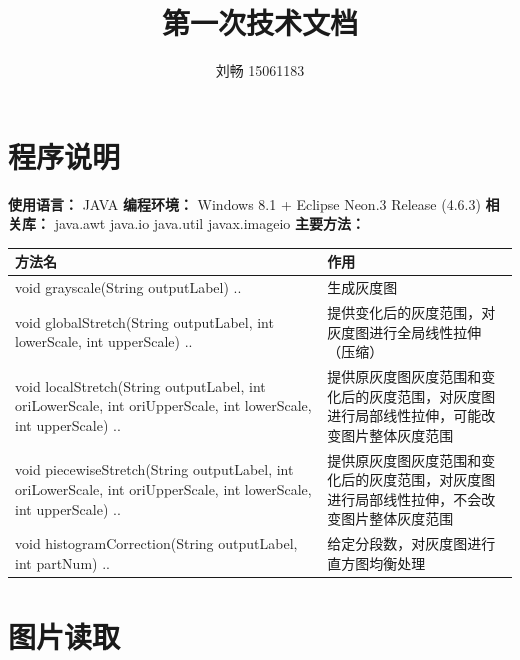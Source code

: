 \documentclass[UTF8]{ctexart}
\title{第一次技术文档}
\author{刘畅 15061183}
\begin{document}
	\maketitle
	\section{程序说明}
	\noindent
	\textbf{使用语言：} JAVA \newline
	\textbf{编程环境：} Windows 8.1 + Eclipse Neon.3 Release (4.6.3) \newline
	\textbf{相关库：}\newline
	\indent java.awt\newline
	\indent java.io\newline
	\indent java.util\newline
	\indent javax.imageio\newline
	\textbf{主要方法：} \newline
	\begin{tabular}{p{10cm}p{7cm}}
	\hline
	\textbf{方法名}& \textbf{作用} \\
	\hline
	void grayscale(String outputLabel) {..}&  生成灰度图\\
	\hline
	void globalStretch(String outputLabel, int lowerScale, int upperScale) {..}&  提供变化后的灰度范围，对灰度图进行全局线性拉伸（压缩）\\
	\hline
	void localStretch(String outputLabel, int oriLowerScale, int oriUpperScale, int lowerScale, int upperScale) {..}&  提供原灰度图灰度范围和变化后的灰度范围，对灰度图进行局部线性拉伸，可能改变图片整体灰度范围\\
	\hline
	void piecewiseStretch(String outputLabel, int oriLowerScale, int oriUpperScale, int lowerScale, int upperScale) {..}& 提供原灰度图灰度范围和变化后的灰度范围，对灰度图进行局部线性拉伸，不会改变图片整体灰度范围 \\
	\hline
	void histogramCorrection(String outputLabel, int partNum) {..}&  给定分段数，对灰度图进行直方图均衡处理\\
	\hline
	\end{tabular}

	\section{图片读取}
\end{document}

